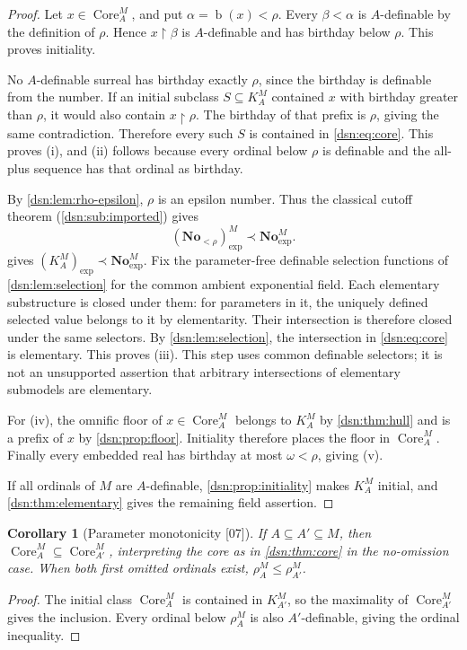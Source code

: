 \documentclass[11pt,a4paper]{article}
\numberwithin{equation}{section}
\newtheorem{corollary}[corollary]{Corollary}
\theoremstyle{definition}
\theoremstyle{remark}
\newcommand{\No}{\mathbf{No}}
\newcommand{\bd}{\operatorname{b}}
\newcommand{\Core}{\operatorname{Core}}
\newcommand{\res}{\mathbin{\upharpoonright}}
\newcommand{\src}[1]{\textup{\textsf{\small[#1]}}}
\begin{document}
\begin{proof}
Let $x\in\Core^M_A$, and put $\alpha=\bd(x)<\rho$. Every $\beta<\alpha$ is
$A$-definable by the definition of $\rho$. Hence $x\res\beta$ is
$A$-definable and has birthday below $\rho$. This proves initiality.

No $A$-definable surreal has birthday exactly $\rho$, since the birthday is
definable from the number. If an initial subclass $S\subseteq K^M_A$
contained $x$ with birthday greater than $\rho$, it would also contain
$x\res\rho$. The birthday of that prefix is $\rho$, giving the same
contradiction. Therefore every such $S$ is contained in \eqref{dsn:eq:core}.
This proves (i), and (ii) follows because every ordinal below $\rho$ is
definable and the all-plus sequence has that ordinal as birthday.

By \cref{dsn:lem:rho-epsilon}, $\rho$ is an epsilon number. Thus the
classical cutoff theorem (\cref{dsn:sub:imported}) gives
\[
 (\No_{<\rho})^M_{\exp}\prec\No^M_{\exp}.
\]
 gives $(K^M_A)_{\exp}\prec\No^M_{\exp}$. Fix the
parameter-free definable selection functions of \cref{dsn:lem:selection}
for the common ambient exponential field. Each elementary substructure is
closed under them: for parameters in it, the uniquely defined selected
value belongs to it by elementarity. Their intersection is therefore closed
under the same selectors. By \cref{dsn:lem:selection}, the intersection in
\eqref{dsn:eq:core} is elementary. This proves (iii). This step uses common
definable selectors; it is not an unsupported assertion that arbitrary
intersections of elementary submodels are elementary.

For (iv), the omnific floor of $x\in\Core^M_A$ belongs to $K^M_A$ by
\cref{dsn:thm:hull} and is a prefix of $x$ by \cref{dsn:prop:floor}.
Initiality therefore places the floor in $\Core^M_A$. Finally every
embedded real has birthday at most $\omega<\rho$, giving (v).

If all ordinals of $M$ are $A$-definable, \cref{dsn:prop:initiality} makes
$K^M_A$ initial, and \cref{dsn:thm:elementary} gives the remaining field
assertion.
\end{proof}

\begin{corollary}[Parameter monotonicity \src{07}]\label{dsn:cor:core-monotone}
If $A\subseteq A'\subseteq M$, then $\Core^M_A\subseteq\Core^M_{A'}$,
interpreting the core as in \cref{dsn:thm:core} in the no-omission case.
When both first omitted ordinals exist, $\rho^M_A\le\rho^M_{A'}$.
\end{corollary}
\begin{proof}
The initial class $\Core^M_A$ is contained in $K^M_{A'}$, so the
maximality of $\Core^M_{A'}$ gives the inclusion. Every ordinal below
$\rho^M_A$ is also $A'$-definable, giving the ordinal inequality.
\end{proof}
\end{document}
